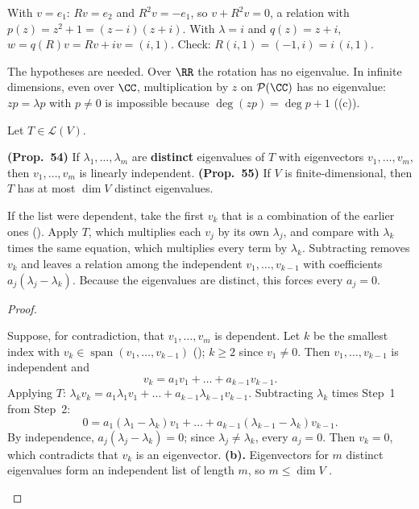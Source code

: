 \documentclass[10pt]{scrartcl}
\DeclareMathOperator{\spn}{span}\DeclareMathOperator{\nul}{null}\DeclareMathOperator{\range}{range}
\newcommand{\PP}{\mathcal P}\newcommand{\LL}{\mathcal L}\newcommand{\MM}{\mathcal M}\newcommand{\T}{\mathsf T}
\begin{document}
\begin{example*}
  With $v=e_1$: $Rv=e_2$ and $R^2v=-e_1$, so $v+R^2v=0$, a relation with $p(z)=z^2+1=(z-i)(z+i)$. With $\lambda=i$ and $q(z)=z+i$, $w=q(R)v=Rv+iv=(i,1)$. Check: $R(i,1)=(-1,i)=i\,(i,1)$.
\end{example*}

The hypotheses are needed. Over $\RR$ the rotation has no eigenvalue. In infinite dimensions, even over $\CC$, multiplication by $z$ on $\PP(\CC)$ has no eigenvalue: $zp=\lambda p$ with $p\ne0$ is impossible because $\deg(zp)=\deg p+1$ ((c)).

\begin{theorem*}
  Let $T\in\LL(V)$.
  \begin{enumerate}[(a)]
    \ii \textbf{(Prop.~54)} If $\lambda_1,\dots,\lambda_m$ are \textbf{distinct} eigenvalues of $T$ with eigenvectors $v_1,\dots,v_m$, then $v_1,\dots,v_m$ is linearly independent.
    \ii \textbf{(Prop.~55)} If $V$ is finite-dimensional, then $T$ has at most $\dim V$ distinct eigenvalues.
  \end{enumerate}
\end{theorem*}
\begin{ideabox}
  If the list were dependent, take the first $v_k$ that is a combination of the earlier ones (). Apply $T$, which multiplies each $v_j$ by its own $\lambda_j$, and compare with $\lambda_k$ times the same equation, which multiplies every term by $\lambda_k$. Subtracting removes $v_k$ and leaves a relation among the independent $v_1,\dots,v_{k-1}$ with coefficients $a_j(\lambda_j-\lambda_k)$. Because the eigenvalues are distinct, this forces every $a_j=0$.
\end{ideabox}
\begin{proof}
  \begin{steps}
    \ii Suppose, for contradiction, that $v_1,\dots,v_m$ is dependent. Let $k$ be the smallest index with $v_k\in\spn(v_1,\dots,v_{k-1})$ (); $k\ge2$ since $v_1\ne0$. Then $v_1,\dots,v_{k-1}$ is independent and
    \[
      v_k = a_1v_1 + \dots + a_{k-1}v_{k-1}.
    \]
    \ii Applying $T$: $\lambda_kv_k=a_1\lambda_1v_1+\dots+a_{k-1}\lambda_{k-1}v_{k-1}$.
    \ii Subtracting $\lambda_k$ times Step~1 from Step~2:
    \[
      0=a_1(\lambda_1-\lambda_k)v_1+\dots+a_{k-1}(\lambda_{k-1}-\lambda_k)v_{k-1}.
    \]
    \ii By independence, $a_j(\lambda_j-\lambda_k)=0$; since $\lambda_j\ne\lambda_k$, every $a_j=0$. Then $v_k=0$, which contradicts that $v_k$ is an eigenvector.
    \ii \textbf{(b).} Eigenvectors for $m$ distinct eigenvalues form an independent list of length $m$, so $m\le\dim V$ .
  \end{steps}
\end{proof}
\end{document}
